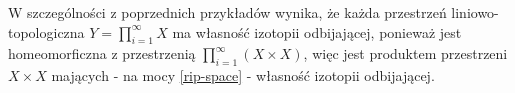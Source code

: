 \begin{ex}
  W szczególności z poprzednich przykładów wynika, że każda przestrzeń liniowo-topologiczna $Y = \prod_{i=1}^\infty X$ ma własność izotopii odbijającej, ponieważ jest homeomorficzna z przestrzenią $\prod_{i=1}^\infty (X \times X)$, więc jest produktem przestrzeni $X \times X$ mających - na mocy \ref{rip-space} - własność izotopii odbijającej.
\end{ex}


